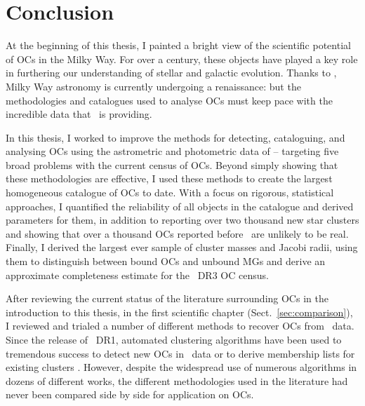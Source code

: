 %
\chapter{Conclusion}
\label{sec:conclusion}


At the beginning of this thesis, I painted a bright view of the scientific potential of OCs in the Milky Way. For over a century, these objects have played a key role in furthering our understanding of stellar and galactic evolution. Thanks to \gaia, Milky Way astronomy is currently undergoing a renaissance: but the methodologies and catalogues used to analyse OCs must keep pace with the incredible data that \gaia\ is providing.

In this thesis, I worked to improve the methods for detecting, cataloguing, and analysing OCs using the astrometric and photometric data of \gaia -- targeting five broad problems with the current census of OCs. Beyond simply showing that these methodologies are effective, I used these methods to create the largest homogeneous catalogue of OCs to date. With a focus on rigorous, statistical approaches, I quantified the reliability of all objects in the catalogue and derived parameters for them, in addition to reporting over two thousand new star clusters and showing that over a thousand OCs reported before \gaia\ are unlikely to be real. Finally, I derived the largest ever sample of cluster masses and Jacobi radii, using them to distinguish between bound OCs and unbound MGs and derive an approximate completeness estimate for the \gaia\ DR3 OC census.

After reviewing the current status of the literature surrounding OCs in the introduction to this thesis, in the first scientific chapter (Sect.~\ref{sec:comparison}), I reviewed and trialed a number of different methods to recover OCs from \gaia\ data. Since the release of \gaia\ DR1, automated clustering algorithms have been used to tremendous success to detect new OCs in \gaia\ data or to derive membership lists for existing clusters \citep[e.g.][]{castro-ginard_new_2018,castro-ginard_hunting_2019,castro-ginard_hunting_2020,castro-ginard_hunting_2022,liu_catalog_2019,cantat-gaudin_characterising_2018,cantat-gaudin_clusters_2020,cantat-gaudin_gaia_2019,he_catalogue_2021,he_new_2022,hao_sixteen_2020,jaehnig_membership_2021}. However, despite the widespread use of numerous algorithms in dozens of different works, the different methodologies used in the literature had never been compared side by side for application on OCs.

